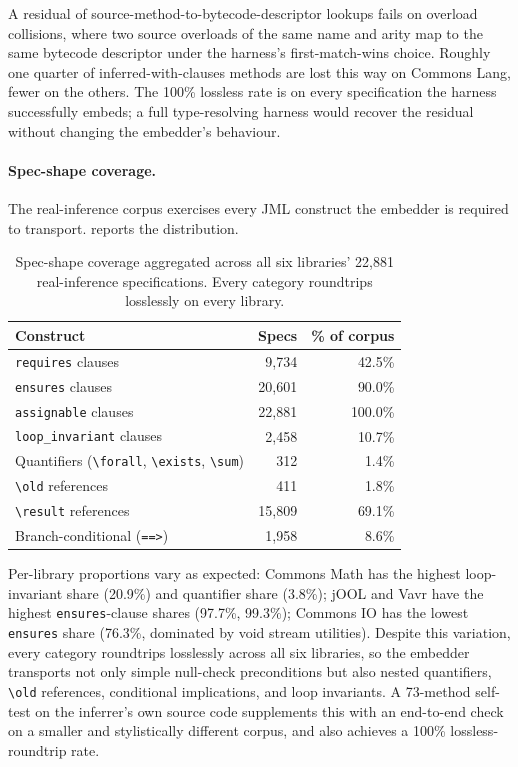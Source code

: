 A residual of source-method-to-bytecode-descriptor lookups fails on overload
collisions, where two source overloads of the same name and arity map to the
same bytecode descriptor under the harness's first-match-wins choice. Roughly one
quarter of inferred-with-clauses methods are lost this way on Commons Lang, fewer
on the others. The 100\% lossless rate is on every specification the harness
successfully embeds; a full type-resolving harness would recover the residual
without changing the embedder's behaviour.

\paragraph{Spec-shape coverage.}
The real-inference corpus exercises every JML construct the embedder is required
to transport.  reports the distribution.

\begin{table}[ht]
\centering
\caption{Spec-shape coverage aggregated across all six libraries' 22{,}881
real-inference specifications. Every category roundtrips losslessly on every
library.}
\label{tab:a2-shapes}
\begin{tabular}{lrr}
\toprule
\textbf{Construct} & \textbf{Specs} & \textbf{\% of corpus} \\
\midrule
\texttt{requires} clauses               & 9{,}734  & 42.5\% \\
\texttt{ensures} clauses                & 20{,}601 & 90.0\% \\
\texttt{assignable} clauses             & 22{,}881 & 100.0\% \\
\texttt{loop\_invariant} clauses        & 2{,}458  & 10.7\% \\
Quantifiers (\texttt{\textbackslash forall}, \texttt{\textbackslash exists}, \texttt{\textbackslash sum}) & 312 & 1.4\% \\
\texttt{\textbackslash old} references  & 411    & 1.8\% \\
\texttt{\textbackslash result} references & 15{,}809 & 69.1\% \\
Branch-conditional (\texttt{==>})       & 1{,}958  & 8.6\% \\
\bottomrule
\end{tabular}
\end{table}

Per-library proportions vary as expected: Commons Math has the highest
loop-invariant share (20.9\%) and quantifier share (3.8\%); jOOL and Vavr have
the highest \texttt{ensures}-clause shares (97.7\%, 99.3\%); Commons IO has the
lowest \texttt{ensures} share (76.3\%, dominated by void stream utilities).
Despite this variation, every category roundtrips losslessly across all six
libraries, so the embedder transports not only simple null-check preconditions
but also nested quantifiers, \texttt{\textbackslash old} references, conditional
implications, and loop invariants. A 73-method self-test on the inferrer's own
source code supplements this with an end-to-end check on a smaller and
stylistically different corpus, and also achieves a 100\% lossless-roundtrip
rate.

